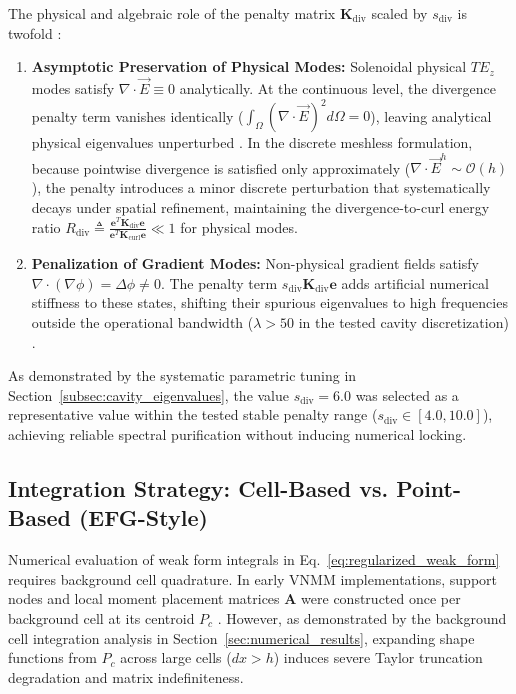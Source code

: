 \documentclass[preprint,12pt]{elsarticle}
\begin{document}
The physical and algebraic role of the penalty matrix $\mathbf{K}_{\mathrm{div}}$ scaled by $s_{\mathrm{div}}$ is twofold \cite{monk2003finite, bossavit1990spurious}:
\begin{enumerate}
    \item \textbf{Asymptotic Preservation of Physical Modes:} Solenoidal physical $TE_z$ modes satisfy $\nabla \cdot \vec{E} \equiv 0$ analytically. At the continuous level, the divergence penalty term vanishes identically ($\int_\Omega (\nabla \cdot \vec{E})^2 d\Omega = 0$), leaving analytical physical eigenvalues unperturbed \cite{monk2003finite, jin2014finite}. In the discrete meshless formulation, because pointwise divergence is satisfied only approximately ($\nabla \cdot \vec{E}^h \sim \mathcal{O}(h)$), the penalty introduces a minor discrete perturbation that systematically decays under spatial refinement, maintaining the divergence-to-curl energy ratio $R_{\mathrm{div}} \triangleq \frac{\mathbf{e}^T \mathbf{K}_{\mathrm{div}} \mathbf{e}}{\mathbf{e}^T \mathbf{K}_{\mathrm{curl}} \mathbf{e}} \ll 1$ for physical modes.
    \item \textbf{Penalization of Gradient Modes:} Non-physical gradient fields satisfy $\nabla \cdot (\nabla \phi) = \Delta \phi \neq 0$. The penalty term $s_{\mathrm{div}} \mathbf{K}_{\mathrm{div}} \mathbf{e}$ adds artificial numerical stiffness to these states, shifting their spurious eigenvalues to high frequencies outside the operational bandwidth ($\lambda > 50$ in the tested cavity discretization) \cite{monk2003finite, bossavit1990spurious, boffi1999computational}.
\end{enumerate}
As demonstrated by the systematic parametric tuning in Section~\ref{subsec:cavity_eigenvalues}, the value $s_{\mathrm{div}} = 6.0$ was selected as a representative value within the tested stable penalty range ($s_{\mathrm{div}} \in [4.0, 10.0]$), achieving reliable spectral purification without inducing numerical locking.



\subsection{Integration Strategy: Cell-Based vs. Point-Based (EFG-Style)}
\label{subsec:integration_strategy}

Numerical evaluation of weak form integrals in Eq.~\eqref{eq:regularized_weak_form} requires background cell quadrature. In early VNMM implementations, support nodes and local moment placement matrices $\mathbf{A}$ were constructed once per background cell at its centroid $P_c$ \cite{ortiz2021nodal, ortiz2023tese}. However, as demonstrated by the background cell integration analysis in Section~\ref{sec:numerical_results}, expanding shape functions from $P_c$ across large cells ($dx > h$) induces severe Taylor truncation degradation and matrix indefiniteness.
\end{document}
